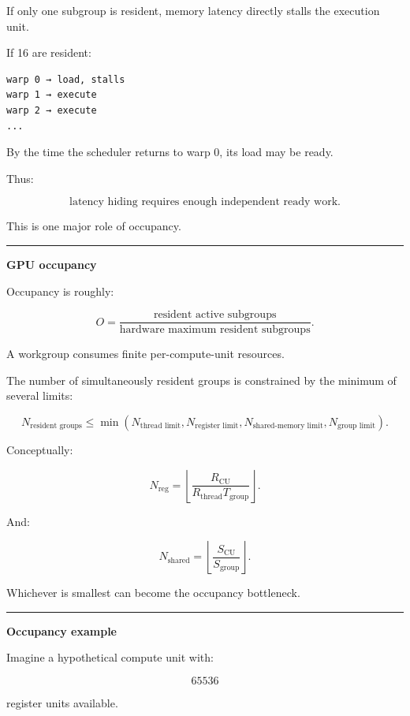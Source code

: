 If only one subgroup is resident, memory latency directly stalls the execution unit.

If 16 are resident:

\protect{}\label{bnfz56}%
\begin{verbatim}
warp 0 → load, stalls
warp 1 → execute
warp 2 → execute
...
\end{verbatim}

By the time the scheduler returns to warp 0, its load may be ready.

Thus:

\[
\boxed{
\text{latency hiding requires enough independent ready work}.
}
\]

This is one major role of occupancy.

\begin{center}\rule{0.5\linewidth}{0.5pt}\end{center}

\textbf{GPU occupancy}

Occupancy is roughly:

\[
\boxed{
O=
\frac{
\text{resident active subgroups}
}{
\text{hardware maximum resident subgroups}
}.
}
\]

A workgroup consumes finite per-compute-unit resources.

The number of simultaneously resident groups is constrained by the minimum of several limits:

\[
N_{\text{resident groups}}
\le
\min
\left(
N_{\text{thread limit}},
N_{\text{register limit}},
N_{\text{shared-memory limit}},
N_{\text{group limit}}
\right).
\]

Conceptually:

\[
N_{\text{reg}}
=
\left\lfloor
\frac{
R_{\text{CU}}
}{
R_{\text{thread}}
T_{\text{group}}
}
\right\rfloor.
\]

And:

\[
N_{\text{shared}}
=
\left\lfloor
\frac{
S_{\text{CU}}
}{
S_{\text{group}}
}
\right\rfloor.
\]

Whichever is smallest can become the occupancy bottleneck.

\begin{center}\rule{0.5\linewidth}{0.5pt}\end{center}

\textbf{Occupancy example}

Imagine a hypothetical compute unit with:

\[
65536
\]

register units available.

